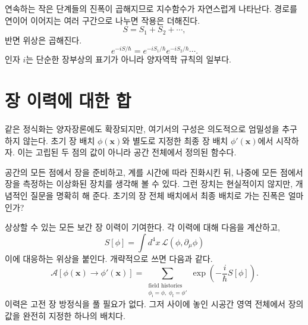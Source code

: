 연속하는 작은 단계들의 진폭이 곱해지므로 지수함수가 자연스럽게 나타난다. 경로를 연이어 이어지는 여러 구간으로 나누면 작용은 더해진다.\begin{equation}
S=S_1+S_2+\cdots,
\end{equation}반면 위상은 곱해진다.\begin{equation}
e^{-iS/\hbar}
=e^{-iS_1/\hbar}e^{-iS_2/\hbar}\cdots.
\end{equation}인자 \(i\)는 단순한 장부상의 표기가 아니라 양자역학 규칙의 일부다.

\begin{classroomqa}
\end{classroomqa}

\begin{classroomqa}
\end{classroomqa}

\section{장 이력에 대한 합}

같은 정식화는 양자장론에도 확장되지만, 여기서의 구성은 의도적으로 엄밀성을 추구하지 않는다. 초기 장 배치 \(\phi(\mathbf{x})\)와 별도로 지정한 최종 장 배치 \(\phi'(\mathbf{x})\)에서 시작하자. 이는 고립된 두 점의 값이 아니라 공간 전체에서 정의된 함수다.

공간의 모든 점에서 장을 준비하고, 계를 시간에 따라 진화시킨 뒤, 나중에 모든 점에서 장을 측정하는 이상화된 장치를 생각해 볼 수 있다. 그런 장치는 현실적이지 않지만, 개념적인 질문을 명확히 해 준다. 초기의 장 전체 배치에서 최종 배치로 가는 진폭은 얼마인가?

상상할 수 있는 모든 보간 장 이력이 기여한다. 각 이력에 대해 다음을 계산하고,\begin{equation}
S[\phi]=\int d^4x\,\mathcal{L}(\phi,\partial_\mu\phi)
\end{equation}이에 대응하는 위상을 붙인다. 개략적으로 쓰면 다음과 같다.\begin{equation}
\mathcal{A}\!\left[\phi(\mathbf{x})\rightarrow\phi'(\mathbf{x})\right]
=
\sum_{\substack{\text{field histories}\\
\phi_{\mathrm{i}}=\phi,\;\phi_{\mathrm{f}}=\phi'}}
\exp\!\left(-\frac{i}{\hbar}S[\phi]\right).
\end{equation}이력은 고전 장 방정식을 풀 필요가 없다. 그저 사이에 놓인 시공간 영역 전체에서 장의 값을 완전히 지정한 하나의 배치다.

